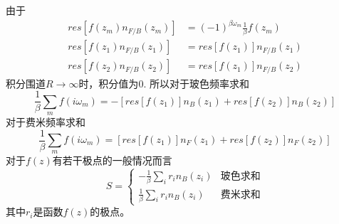\documentclass{article}
\numberwithin{equation}{subsection}
\begin{document}
由于
\begin{equation}
    \begin{split}
        res[f(z_m)n_{F/B}(z_m)]&=(-1)^{\beta\omega_m}\frac{1}{\beta}f(z_m)\\
        res[f(z_1)n_{F/B}(z_1)]&=res[f(z_1)]n_{F/B}(z_1)\\
        res[f(z_2)n_{F/B}(z_2)]&=res[f(z_1)]n_{F/B}(z_2)
    \end{split}
\end{equation} 
积分围道$R\to\infty$时，积分值为$0$. 所以对于玻色频率求和
\begin{equation}
    \frac{1}{\beta}\sum_mf(i\omega_m)=-[res[f(z_1)]n_{B}(z_1)+res[f(z_2)]n_{B}(z_2)]
\end{equation}
对于费米频率求和
\begin{equation}
    \frac{1}{\beta}\sum_mf(i\omega_m)=[res[f(z_1)]n_{F}(z_1)+res[f(z_2)]n_{F}(z_2)]
\end{equation}
对于$f(z)$有若干极点的一般情况而言
\begin{equation}
    S=\begin{cases}
        -\frac{1}{\beta}\sum_{i}r_in_B(z_i)&\text{玻色求和}\\
        \frac{1}{\beta}\sum_{i}r_in_B(z_i)&\text{费米求和}
    \end{cases}
\end{equation}
其中$r_i$是函数$f(z)$的极点。
\end{document}
